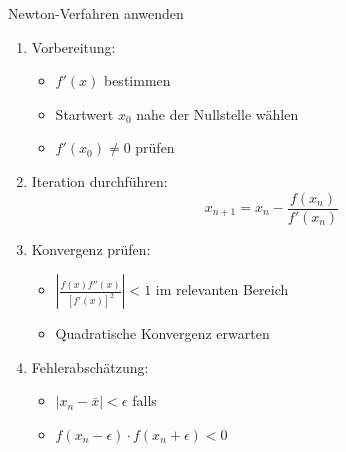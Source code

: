 \begin{KR}{Newton-Verfahren anwenden}
\begin{enumerate}
    \item Vorbereitung:
    \begin{itemize}
        \item $f'(x)$ bestimmen
        \item Startwert $x_0$ nahe der Nullstelle wählen
        \item $f'(x_0) \neq 0$ prüfen
    \end{itemize}
    
    \item Iteration durchführen:
    $$x_{n+1} = x_n - \frac{f(x_n)}{f'(x_n)}$$
    
    \item Konvergenz prüfen:
    \begin{itemize}
        \item $|\frac{f(x)f''(x)}{[f'(x)]^2}| < 1$ im relevanten Bereich
        \item Quadratische Konvergenz erwarten
    \end{itemize}
    
    \item Fehlerabschätzung:
    \begin{itemize}
        \item $|x_n-\bar{x}| < \epsilon$ falls
        \item $f(x_n-\epsilon) \cdot f(x_n+\epsilon) < 0$
    \end{itemize}
\end{enumerate}
\end{KR}

